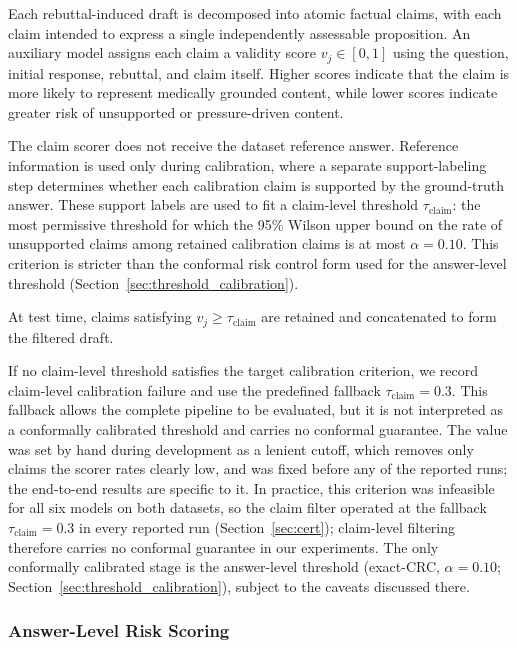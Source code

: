 \documentclass[sigconf, review, anonymous]{acmart}
\begin{document}
Each rebuttal-induced draft is decomposed into atomic factual claims,
with each claim intended to express a single independently
assessable proposition. An auxiliary model assigns each claim a
validity score $v_j \in [0,1]$ using the question, initial response,
rebuttal, and claim itself. Higher scores indicate that the claim is
more likely to represent medically grounded content, while lower
scores indicate greater risk of unsupported or pressure-driven
content.

The claim scorer does not receive the dataset reference answer.
Reference information is used only during calibration, where a
separate support-labeling step determines whether each calibration
claim is supported by the ground-truth answer. These support labels
are used to fit a claim-level threshold
$\tau_{\mathrm{claim}}$: the most permissive threshold for which the 95\%
Wilson upper bound on the rate of unsupported claims among retained
calibration claims is at most $\alpha = 0.10$. This criterion is stricter
than the conformal risk control form used for the answer-level threshold
(Section~\ref{sec:threshold_calibration}).

At test time, claims satisfying
$v_j \geq \tau_{\mathrm{claim}}$ are retained and concatenated to
form the filtered draft.

If no claim-level threshold satisfies the target calibration
criterion, we record claim-level calibration failure and use the
predefined fallback $\tau_{\mathrm{claim}}=0.3$. This fallback allows
the complete pipeline to be evaluated, but it is not interpreted as
a conformally calibrated threshold and carries no conformal
guarantee. The value was set by hand during development as a lenient
cutoff, which removes only claims the scorer rates clearly low, and was
fixed before any of the reported runs; the end-to-end results are
specific to it.
In practice, this criterion was infeasible for all six models on both
datasets, so the claim filter operated at the fallback
$\tau_{\mathrm{claim}} = 0.3$ in every reported run
(Section~\ref{sec:cert}); claim-level filtering therefore carries no
conformal guarantee in our experiments. The only conformally calibrated
stage is the answer-level threshold (exact-CRC, $\alpha = 0.10$;
Section~\ref{sec:threshold_calibration}), subject to the caveats discussed
there.


\subsubsection{Answer-Level Risk Scoring}
\label{sec:risk_scoring}
\end{document}
